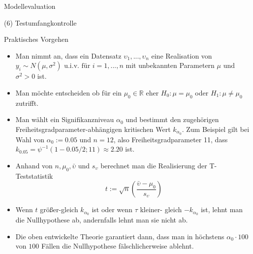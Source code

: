 \documentclass[
  8pt,
  ignorenonframetext,
]{beamer}
\begin{document}
\begin{frame}{Modellevaluation}
\protect\hypertarget{modellevaluation-14}{}
\justifying
{}

\noindent (6) Testumfangkontrolle \vspace{1mm}

Praktisches Vorgehen \small

\begin{itemize}
\item
  \justifying Man nimmt an, dass ein Datensatz
  \(\upsilon_1,...,\upsilon_n\) eine Realisation von
  \(y_i \sim N(\mu,\sigma^2) \mbox{ u.i.v. für } i = 1,...,n\) mit
  unbekannten Parametern \(\mu\) und \(\sigma^2 > 0\) ist.
\item
  Man möchte entscheiden ob für ein \(\mu_0 \in \mathbb{R}\) eher
  \(H_0 : \mu = \mu_0\) oder \(H_1: \mu \neq \mu_0\) zutrifft.

  \item

  Man wählt ein Signifikanzniveau \(\alpha_0\) und bestimmt den
  zugehörigen Freiheitsgradparameter-abhängigen kritischen Wert
  \(k_{\alpha_0}\). Zum Beispiel gilt bei Wahl von \(\alpha_0 := 0.05\)
  und \(n=12\), also Freiheitsgradparameter 11, dass
  \(k_{0.05}=\psi^{-1}(1 - 0.05/2; 11) \approx 2.20\) ist.
\item
  Anhand von \(n, \mu_0, \bar{\upsilon}\) und \(s_\upsilon\) berechnet
  man die Realisierung der T-Teststatistik \begin{equation}
  t:= \sqrt{n}\left(\frac{\bar{\upsilon} - \mu_0}{s_\upsilon}\right)
  \end{equation}
\item
  Wenn \(t\) größer-gleich \(k_{\alpha_0}\) ist oder wenn \(\tau\)
  kleiner- gleich \(-k_{\alpha_0}\) ist, lehnt man die Nullhypothese ab,
  andernfalls lehnt man sie nicht ab.
\item
  Die oben entwickelte Theorie garantiert dann, dass man in höchstens
  \(\alpha_0 \cdot 100\) von \(100\) Fällen die Nullhypothese
  fälschlicherweise ablehnt.
\end{itemize}
\end{frame}
\end{document}
